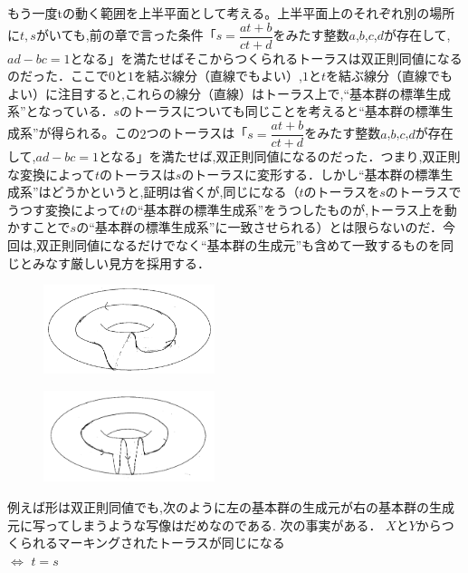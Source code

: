 もう一度tの動く範囲を上半平面として考える。上半平面上のそれぞれ別の場所に$t,s$がいても,前の章で言った条件「$s=\dfrac {at+b} {ct+d}$をみたす整数$a$,$b$,$c$,$d$が存在して,$ad-bc=1$となる」を満たせばそこからつくられるトーラスは双正則同値になるのだった．ここで$0$と$1$を結ぶ線分（直線でもよい）,$1$と$t$を結ぶ線分（直線でもよい）に注目すると,これらの線分（直線）はトーラス上で,``基本群の標準生成系''となっている．$s$のトーラスについても同じことを考えると``基本群の標準生成系''が得られる。この$2$つのトーラスは「$s=\dfrac {at+b} {ct+d}$をみたす整数$a$,$b$,$c$,$d$が存在して,$ad-bc=1$となる」を満たせば,双正則同値になるのだった．つまり,双正則な変換によって$t$のトーラスは$s$のトーラスに変形する．しかし``基本群の標準生成系''はどうかというと,証明は省くが,同じになる（$t$のトーラスを$s$のトーラスでうつす変換によって$t$の``基本群の標準生成系''をうつしたものが,トーラス上を動かすことで$s$の``基本群の標準生成系''に一致させられる）とは限らないのだ．今回は,双正則同値になるだけでなく``基本群の生成元''も含めて一致するものを同じとみなす厳しい見方を採用する．\\
\begin{figure}[h]
\begin{minipage}{0.5\hsize}
\includegraphics[width=5cm]{asaka12.png}\\
\end{minipage}
\begin{minipage}{0.5\hsize}
\includegraphics[width=5cm]{asaka14.png}\\
\end{minipage}
\end{figure}
例えば形は双正則同値でも,次のように左の基本群の生成元が右の基本群の生成元に写ってしまうような写像はだめなのである.
\newpage
次の事実がある．
\thm
$X$と$Y$からつくられるマーキングされたトーラスが同じになる\\
$\Leftrightarrow $ $t=s$
\thmx
